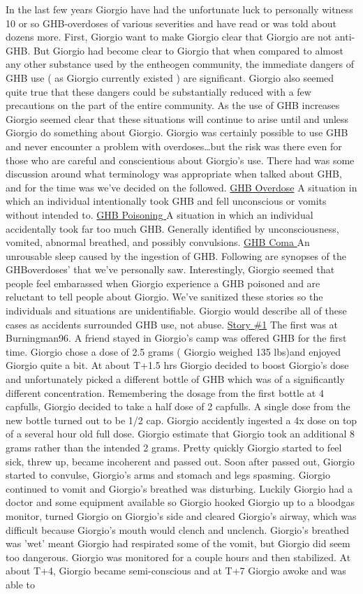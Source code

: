 \documentclass[12pt]{book}
\begin{document}
In the last few years Giorgio have had the unfortunate luck to personally witness 10 or so GHB-overdoses of various severities and have read or was told about dozens more. First, Giorgio want to make Giorgio clear that Giorgio are not anti-GHB. But Giorgio had become clear to Giorgio that when compared to almost any other substance used by the entheogen community, the immediate dangers of GHB use ( as Giorgio currently existed ) are significant. Giorgio also seemed quite true that these dangers could be substantially reduced with a few precautions on the part of the entire community. As the use of GHB increases Giorgio seemed clear that these situations will continue to arise until and unless Giorgio do something about Giorgio. Giorgio was certainly possible to use GHB and never encounter a problem with overdoses\ldots but the risk was there even for those who are careful and conscientious about Giorgio's use. There had was some discussion around what terminology was appropriate when talked about GHB, and for the time was we've decided on the followed. \underline{GHB Overdose} A situation in which an individual intentionally took GHB and fell unconscious or vomits without intended to. \underline{GHB Poisoning } A situation in which an individual accidentally took far too much GHB. Generally identified by unconsciousness, vomited, abnormal breathed, and possibly convulsions. \underline{GHB Coma } An unrousable sleep caused by the ingestion of GHB. Following are synopses of the GHBoverdoses' that we've personally saw. Interestingly, Giorgio seemed that people feel embarassed when Giorgio experience a GHB poisoned and are reluctant to tell people about Giorgio. We've sanitized these stories so the individuals and situations are unidentifiable. Giorgio would describe all of these cases as accidents surrounded GHB use, not abuse. \underline{Story \#1} The first was at Burningman96. A friend stayed in Giorgio's camp was offered GHB for the first time. Giorgio chose a dose of 2.5 grams ( Giorgio weighed 135 lbs)and enjoyed Giorgio quite a bit. At about T+1.5 hrs Giorgio decided to boost Giorgio's dose and unfortunately picked a different bottle of GHB which was of a significantly different concentration. Remembering the dosage from the first bottle at 4 capfulls, Giorgio decided to take a half dose of 2 capfulls. A single dose from the new bottle turned out to be 1/2 cap. Giorgio accidently ingested a 4x dose on top of a several hour old full dose. Giorgio estimate that Giorgio took an additional 8 grams rather than the intended 2 grams. Pretty quickly Giorgio started to feel sick, threw up, became incoherent and passed out. Soon after passed out, Giorgio started to convulse, Giorgio's arms and stomach and legs spasming. Giorgio continued to vomit and Giorgio's breathed was disturbing. Luckily Giorgio had a doctor and some equipment available so Giorgio hooked Giorgio up to a bloodgas monitor, turned Giorgio on Giorgio's side and cleared Giorgio's airway, which was difficult because Giorgio's mouth would clench and unclench. Giorgio's breathed was 'wet' meant Giorgio had respirated some of the vomit, but Giorgio did seem too dangerous. Giorgio was monitored for a couple hours and then stabilized. At about T+4, Giorgio became semi-conscious and at T+7 Giorgio awoke and was able to 
\end{document}
